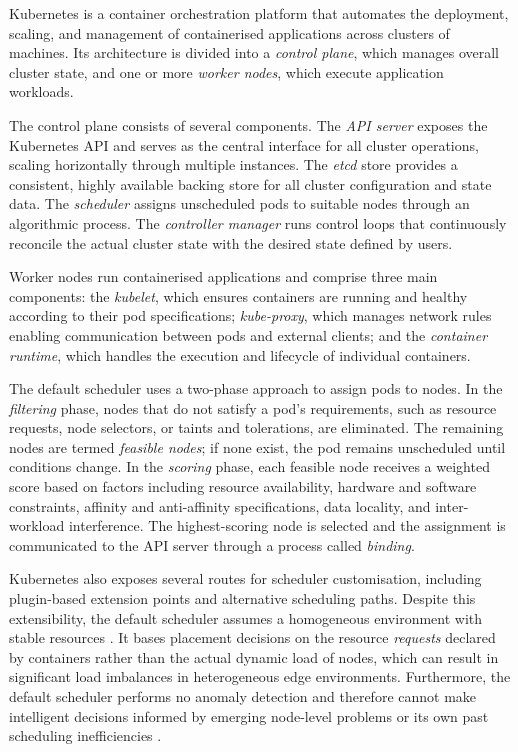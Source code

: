 Kubernetes is a container orchestration platform that automates the deployment, scaling, and management of containerised applications across clusters of machines. Its architecture is divided into a \textit{control plane}, which manages overall cluster state, and one or more \textit{worker nodes}, which execute application workloads.

The control plane consists of several components. The \textit{API server} exposes the Kubernetes API and serves as the central interface for all cluster operations, scaling horizontally through multiple instances. The \textit{etcd} store provides a consistent, highly available backing store for all cluster configuration and state data. The \textit{scheduler} assigns unscheduled pods to suitable nodes through an algorithmic process. The \textit{controller manager} runs control loops that continuously reconcile the actual cluster state with the desired state defined by users.

Worker nodes run containerised applications and comprise three main components: the \textit{kubelet}, which ensures containers are running and healthy according to their pod specifications; \textit{kube-proxy}, which manages network rules enabling communication between pods and external clients; and the \textit{container runtime}, which handles the execution and lifecycle of individual containers.

The default scheduler uses a two-phase approach to assign pods to nodes. In the \textit{filtering} phase, nodes that do not satisfy a pod's requirements, such as resource requests, node selectors, or taints and tolerations, are eliminated. The remaining nodes are termed \textit{feasible nodes}; if none exist, the pod remains unscheduled until conditions change. In the \textit{scoring} phase, each feasible node receives a weighted score based on factors including resource availability, hardware and software constraints, affinity and anti-affinity specifications, data locality, and inter-workload interference. The highest-scoring node is selected and the assignment is communicated to the API server through a process called \textit{binding}.

Kubernetes also exposes several routes for scheduler customisation, including plugin-based extension points and alternative scheduling paths. Despite this extensibility, the default scheduler assumes a homogeneous environment with stable resources \cite{liu2024dynamic}. It bases placement decisions on the resource \textit{requests} declared by containers rather than the actual dynamic load of nodes, which can result in significant load imbalances in heterogeneous edge environments. Furthermore, the default scheduler performs no anomaly detection and therefore cannot make intelligent decisions informed by emerging node-level problems or its own past scheduling inefficiencies \cite{fritzsche2024lightweight}.

